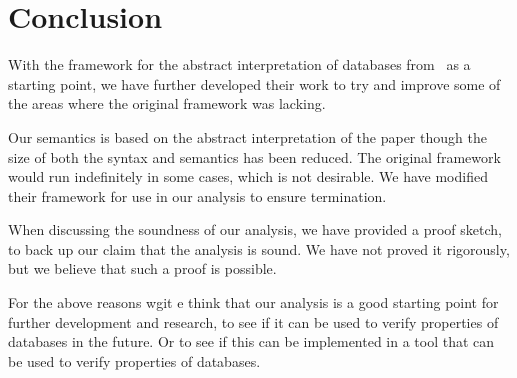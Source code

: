 \section{Conclusion} \label{sec:conclusion}
With the framework for the abstract interpretation of databases from~\cite{halder_abstract_2012} as a starting point, we have further developed their work to try and improve some of the areas where the original framework was lacking.

Our semantics is based on the abstract interpretation of the paper though the size of both the syntax and semantics has been reduced.
The original framework would run indefinitely in some cases, which is not desirable.
We have modified their framework for use in our analysis to ensure termination.

When discussing the soundness of our analysis, we have provided a proof sketch, to back up our claim that the analysis is sound.
We have not proved it rigorously, but we believe that such a proof is possible.

For the above reasons wgit e think that our analysis is a good starting point for further development and research, to see if it can be used to verify properties of databases in the future.
Or to see if this can be implemented in a tool that can be used to verify properties of databases.


